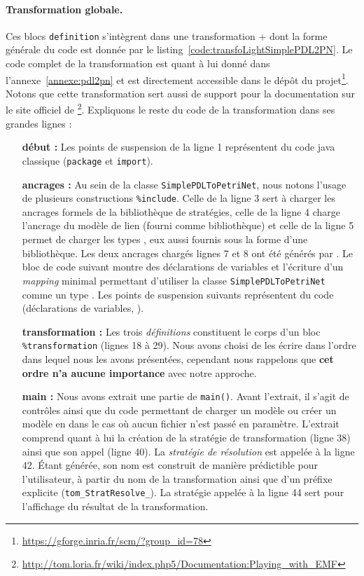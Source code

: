 \paragraph{Transformation globale.}Ces blocs \texttt{definition} s'intègrent
dans une transformation {\tom}+ {\java}
dont la forme générale du code est donnée par le
listing~\ref{code:transfoLightSimplePDL2PN}. Le code complet de la
transformation est quant à lui donné dans l'annexe~\ref{annexe:pdl2pn} et est
directement accessible dans le dépôt du
projet\footnote{\url{https://gforge.inria.fr/scm/?group_id=78}}. Notons que
cette transformation sert aussi de support pour la documentation sur le site
officiel de
{\tom}\footnote{\url{http://tom.loria.fr/wiki/index.php5/Documentation:Playing_with_EMF}}. Expliquons le reste du code de la transformation dans ses grandes lignes :
\begin{itemize}

  \item[\textbf{début :}] Les points de suspension de la ligne 1 représentent
    du code java classique (\texttt{package} et \texttt{import}).

  \item[\textbf{ancrages :}] Au sein de la classe \texttt{SimplePDLToPetriNet},
    nous notons l'usage de plusieurs constructions \texttt{\%include}. Celle de
    la ligne 3 sert à charger les ancrages formels de la bibliothèque de
    stratégies, celle de la ligne 4 charge l'ancrage du modèle de lien (fourni
    comme bibliothèque) et celle de la ligne 5 permet de charger les types
    {\ecore}, eux aussi fournis sous la forme d'une bibliothèque. Les deux
    ancrages chargés lignes 7 et 8 ont été générés par {\tomemf}. Le bloc de
    code suivant montre des déclarations de variables et l'écriture d'un
    \emph{mapping} minimal permettant d'utiliser la classe
    \texttt{SimplePDLToPetriNet} comme un type {\tom}. Les points de suspension
    suivants représentent du code {\java} (déclarations de variables, {\etc}).

  \item[\textbf{transformation :}] Les trois \emph{définitions} constituent le
    corps d'un bloc \texttt{\%transformation} (lignes 18 à 29). Nous avons
    choisi de les écrire dans l'ordre dans lequel nous les avons présentées,
    cependant nous rappelons que \textbf{cet ordre n'a aucune importance} avec
    notre approche. 
  
  
  \item[\textbf{main :}] Nous avons extrait une partie de \texttt{main()}.
    Avant l'extrait, il s'agit de contrôles ainsi que du code permettant de
    charger un modèle ou créer un modèle en {\tom} dans le cas où aucun fichier
    n'est passé en paramètre. L'extrait comprend quant à lui la création de la
    stratégie de transformation (ligne 38) ainsi que son appel (ligne 40). La
    \emph{stratégie de résolution} est appelée à la ligne 42. Étant générée, son
    nom est construit de manière prédictible pour l'utilisateur, à partir du
    nom de la transformation ainsi que d'un préfixe explicite
    (\texttt{tom\_StratResolve\_}). La stratégie appelée à la ligne 44 sert
    pour l'affichage du résultat de la transformation.


\end{itemize}
